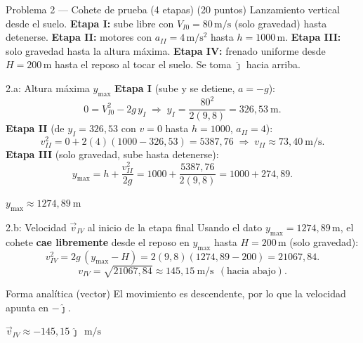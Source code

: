 \documentclass[letterpaper, 11pt]{article}
\begin{document}
\newpage
\begin{enunciadobox}{Problema 2 --- Cohete de prueba (4 etapas) \hfill (20 puntos)}
Lanzamiento vertical desde el suelo. \textbf{Etapa I:} sube libre con
$V_{I0}=80\,\mathrm{m/s}$ (solo gravedad) hasta detenerse. \textbf{Etapa II:}
motores con $a_{II}=4\,\mathrm{m/s^2}$ hasta $h=1000\,\mathrm{m}$. \textbf{Etapa III:}
solo gravedad hasta la altura m\'axima. \textbf{Etapa IV:} frenado uniforme desde
$H=200\,\mathrm{m}$ hasta el reposo al tocar el suelo. Se toma $\hat{\jmath}$ hacia arriba.
\end{enunciadobox}

\begin{paso}{2.a: Altura m\'axima $y_{\max}$}
\textbf{Etapa I} (sube y se detiene, $a=-g$):
\[
0=V_{I0}^2-2g\,y_I \;\Rightarrow\; y_I=\frac{80^2}{2(9{,}8)}=326{,}53\ \mathrm{m}.
\]
\textbf{Etapa II} (de $y_I=326{,}53$ con $v=0$ hasta $h=1000$, $a_{II}=4$):
\[
v_{II}^2=0+2(4)(1000-326{,}53)=5387{,}76 \;\Rightarrow\; v_{II}\approx 73{,}40\ \mathrm{m/s}.
\]
\textbf{Etapa III} (solo gravedad, sube hasta detenerse):
\[
y_{\max}=h+\frac{v_{II}^2}{2g}=1000+\frac{5387{,}76}{2(9{,}8)}=1000+274{,}89 .
\]
\begin{resultado}\centering
$\displaystyle y_{\max}\approx 1274{,}89\ \mathrm{m}$
\end{resultado}
\end{paso}

\begin{paso}{2.b: Velocidad $\vec{v}_{IV}$ al inicio de la etapa final}
Usando el dato $y_{\max}=1274{,}89\,\mathrm{m}$, el cohete \textbf{cae libremente}
desde el reposo en $y_{\max}$ hasta $H=200\,\mathrm{m}$ (solo gravedad):
\[
v_{IV}^2=2g\,(y_{\max}-H)=2(9{,}8)(1274{,}89-200)=21067{,}84 .
\]
\[
v_{IV}=\sqrt{21067{,}84}\approx 145{,}15\ \mathrm{m/s}\ \ (\text{hacia abajo}).
\]
\begin{justif}{Forma anal\'itica (vector)}
El movimiento es descendente, por lo que la velocidad apunta en $-\hat{\jmath}$.
\end{justif}
\begin{resultado}\centering
$\displaystyle \vec{v}_{IV}\approx -145{,}15\,\hat{\jmath}\ \ \mathrm{m/s}$
\end{resultado}
\end{paso}
\end{document}
